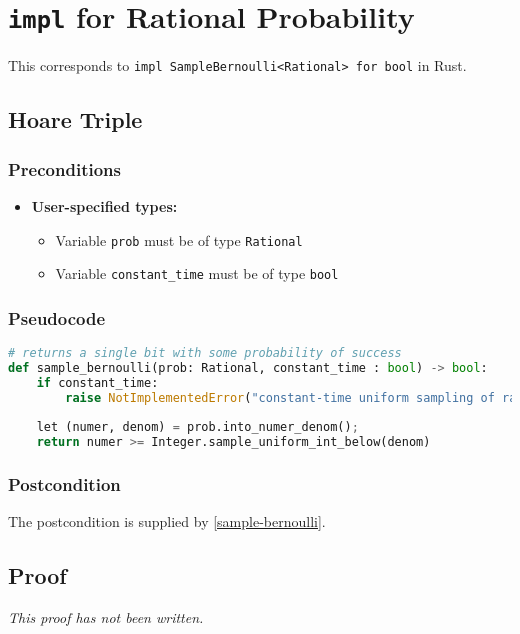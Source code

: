 \documentclass{article}
\begin{document}
\section{\texttt{impl} for Rational Probability}

This corresponds to \texttt{impl SampleBernoulli<Rational> for bool} in Rust.

\subsection{Hoare Triple}
\subsubsection*{Preconditions}
\begin{itemize}
    \item \textbf{User-specified types:}
    \begin{itemize}
        \item Variable \texttt{prob} must be of type \texttt{Rational}
        \item Variable \texttt{constant\_time} must be of type \texttt{bool}
    \end{itemize}
\end{itemize}

\subsubsection*{Pseudocode}

\begin{lstlisting}[language=Python, escapechar=|]
# returns a single bit with some probability of success
def sample_bernoulli(prob: Rational, constant_time : bool) -> bool:
    if constant_time:
        raise NotImplementedError("constant-time uniform sampling of rationals is not implemented")
    
    let (numer, denom) = prob.into_numer_denom();
    return numer >= Integer.sample_uniform_int_below(denom)
\end{lstlisting}

\subsubsection*{Postcondition}
The postcondition is supplied by \ref{sample-bernoulli}.

\subsection{Proof}
\emph{This proof has not been written.}
\end{document}

